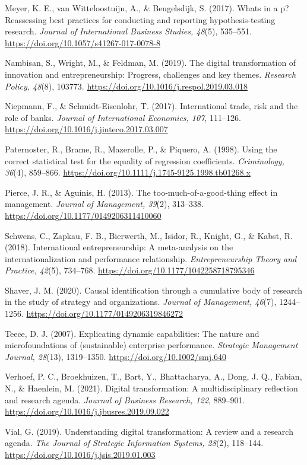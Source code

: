 \documentclass[12pt,a4paper]{article}
\begin{document}
Meyer, K. E., van Witteloostuijn, A., \& Beugelsdijk, S. (2017).
What\textquotesingle s in a p? Reassessing best practices for conducting
and reporting hypothesis-testing research. \emph{Journal of
International Business Studies, 48}(5), 535--551.
\url{https://doi.org/10.1057/s41267-017-0078-8}

Nambisan, S., Wright, M., \& Feldman, M. (2019). The digital
transformation of innovation and entrepreneurship: Progress, challenges
and key themes. \emph{Research Policy, 48}(8), 103773.
\url{https://doi.org/10.1016/j.respol.2019.03.018}

Niepmann, F., \& Schmidt-Eisenlohr, T. (2017). International trade, risk
and the role of banks. \emph{Journal of International Economics, 107},
111--126. \url{https://doi.org/10.1016/j.jinteco.2017.03.007}

Paternoster, R., Brame, R., Mazerolle, P., \& Piquero, A. (1998). Using
the correct statistical test for the equality of regression
coefficients. \emph{Criminology, 36}(4), 859--866.
\url{https://doi.org/10.1111/j.1745-9125.1998.tb01268.x}

Pierce, J. R., \& Aguinis, H. (2013). The too-much-of-a-good-thing
effect in management. \emph{Journal of Management, 39}(2), 313--338.
\url{https://doi.org/10.1177/0149206311410060}

Schwens, C., Zapkau, F. B., Bierwerth, M., Isidor, R., Knight, G., \&
Kabst, R. (2018). International entrepreneurship: A meta-analysis on the
internationalization and performance relationship.
\emph{Entrepreneurship Theory and Practice, 42}(5), 734--768.
\url{https://doi.org/10.1177/1042258718795346}

Shaver, J. M. (2020). Causal identification through a cumulative body of
research in the study of strategy and organizations. \emph{Journal of
Management, 46}(7), 1244--1256.
\url{https://doi.org/10.1177/0149206319846272}

Teece, D. J. (2007). Explicating dynamic capabilities: The nature and
microfoundations of (sustainable) enterprise performance.
\emph{Strategic Management Journal, 28}(13), 1319--1350.
\url{https://doi.org/10.1002/smj.640}

Verhoef, P. C., Broekhuizen, T., Bart, Y., Bhattacharya, A., Dong, J.
Q., Fabian, N., \& Haenlein, M. (2021). Digital transformation: A
multidisciplinary reflection and research agenda. \emph{Journal of
Business Research, 122}, 889--901.
\url{https://doi.org/10.1016/j.jbusres.2019.09.022}

Vial, G. (2019). Understanding digital transformation: A review and a
research agenda. \emph{The Journal of Strategic Information Systems,
28}(2), 118--144. \url{https://doi.org/10.1016/j.jsis.2019.01.003}
\end{document}
